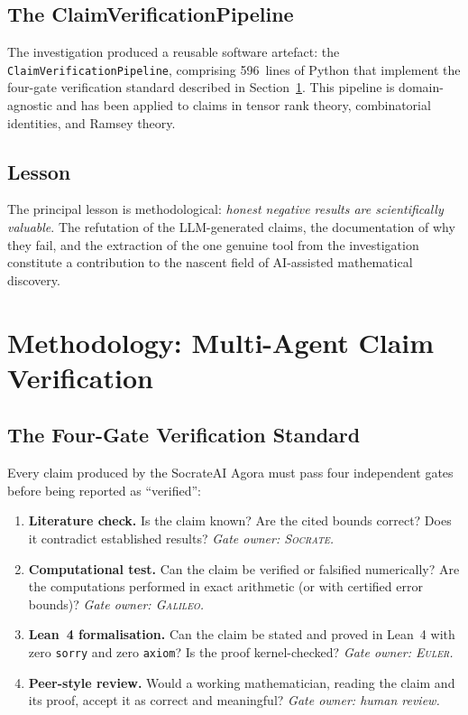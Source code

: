 \documentclass[11pt,a4paper]{article}
\begin{document}
\subsection{The ClaimVerificationPipeline}

The investigation produced a reusable software artefact: the
\texttt{ClaimVerificationPipeline}, comprising 596~lines of Python that
implement the four-gate verification standard described in
Section~\ref{sec:methodology}. This pipeline is domain-agnostic and has been
applied to claims in tensor rank theory, combinatorial identities, and Ramsey
theory.

\subsection{Lesson}

The principal lesson is methodological: \emph{honest negative results are
scientifically valuable}. The refutation of the LLM-generated claims, the
documentation of why they fail, and the extraction of the one genuine tool
from the investigation constitute a contribution to the nascent field of
AI-assisted mathematical discovery.

\section{Methodology: Multi-Agent Claim Verification}\label{sec:methodology}

\subsection{The Four-Gate Verification Standard}

Every claim produced by the SocrateAI Agora must pass four independent
gates before being reported as ``verified'':

\begin{enumerate}
  \item \textbf{Literature check.} Is the claim known? Are the cited bounds
    correct? Does it contradict established results?
    \emph{Gate owner: \textsc{Socrate}.}

  \item \textbf{Computational test.} Can the claim be verified or falsified
    numerically? Are the computations performed in exact arithmetic (or with
    certified error bounds)?
    \emph{Gate owner: \textsc{Galileo}.}

  \item \textbf{Lean~4 formalisation.} Can the claim be stated and proved in
    Lean~4 with zero \texttt{sorry} and zero \texttt{axiom}? Is the proof
    kernel-checked?
    \emph{Gate owner: \textsc{Euler}.}

  \item \textbf{Peer-style review.} Would a working mathematician, reading
    the claim and its proof, accept it as correct and meaningful?
    \emph{Gate owner: human review.}
\end{enumerate}
\end{document}

